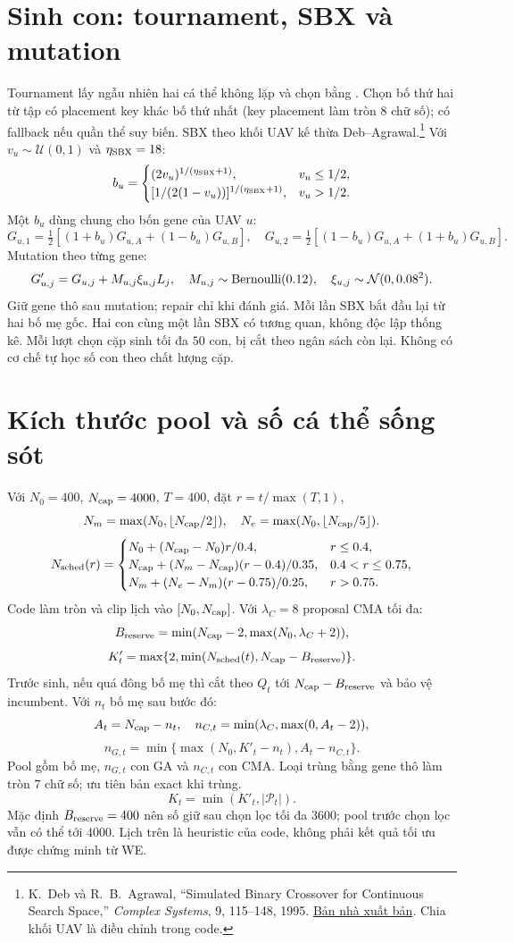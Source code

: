 \documentclass[11pt,a4paper]{article}
\newcommand{\code}[1]{\texttt{\detokenize{#1}}}
\begin{document}
\section{Sinh con: tournament, SBX và mutation}
Tournament lấy ngẫu nhiên hai cá thể không lặp và chọn bằng \code{_better()}.
Chọn bố thứ hai từ tập có placement key khác bố thứ nhất (key placement làm tròn $8$ chữ số); có fallback nếu quần thể suy biến.
SBX theo khối UAV kế thừa Deb--Agrawal.\footnote{K.~Deb và R.~B.~Agrawal, ``Simulated Binary Crossover for Continuous Search Space,'' \emph{Complex Systems}, 9, 115--148, 1995. \href{https://content.wolfram.com/uploads/sites/13/2018/02/09-2-2.pdf}{Bản nhà xuất bản}. Chia khối UAV là điều chỉnh trong code.}
Với $v_u\sim\mathcal U(0,1)$ và $\eta_{\rm SBX}=18$:
\[
b_u=\begin{cases}(2v_u)^{1/(\eta_{\rm SBX}+1)},&v_u\le1/2,\\
[1/(2(1-v_u))]^{1/(\eta_{\rm SBX}+1)},&v_u>1/2.
\end{cases}
\]
Một $b_u$ dùng chung cho bốn gene của UAV $u$:
\[
G_{u,1}=\tfrac12[(1+b_u)G_{u,A}+(1-b_u)G_{u,B}],\quad
G_{u,2}=\tfrac12[(1-b_u)G_{u,A}+(1+b_u)G_{u,B}].
\]
Mutation theo từng gene:
\[
G'_{u,j}=G_{u,j}+M_{u,j}\xi_{u,j}L_j,\quad
M_{u,j}\sim{\rm Bernoulli}(0.12),\quad\xi_{u,j}\sim\mathcal N(0,0.08^2).
\]
Giữ gene thô sau mutation; repair chỉ khi đánh giá. Mỗi lần SBX bắt đầu lại từ hai bố mẹ gốc. Hai con cùng một lần SBX có tương quan, không độc lập thống kê.
Mỗi lượt chọn cặp sinh tối đa $50$ con, bị cắt theo ngân sách còn lại. Không có cơ chế tự học số con theo chất lượng cặp.

\section{Kích thước pool và số cá thể sống sót}
Với $N_0=400$, $N_{\rm cap}=4000$, $T=400$, đặt $r=t/\max(T,1)$,
\[
N_m=\max(N_0,\lfloor N_{\rm cap}/2\rfloor),\quad
N_e=\max(N_0,\lfloor N_{\rm cap}/5\rfloor).
\]
\[
N_{\rm sched}(r)=\begin{cases}
N_0+(N_{\rm cap}-N_0)r/0.4,&r\le0.4,\\
N_{\rm cap}+(N_m-N_{\rm cap})(r-0.4)/0.35,&0.4<r\le0.75,\\
N_m+(N_e-N_m)(r-0.75)/0.25,&r>0.75.
\end{cases}
\]
Code làm tròn và clip lịch vào $[N_0,N_{\rm cap}]$.
Với $\lambda_C=8$ proposal CMA tối đa:
\[
B_{\rm reserve}=\min(N_{\rm cap}-2,\max(N_0,\lambda_C+2)),
\]
\[
K'_t=\max\{2,\min(N_{\rm sched}(t),N_{\rm cap}-B_{\rm reserve})\}.
\]
Trước sinh, nếu quá đông bố mẹ thì cắt theo $Q_t$ tới $N_{\rm cap}-B_{\rm reserve}$ và bảo vệ incumbent.
Với $n_t$ bố mẹ sau bước đó:
\[
A_t=N_{\rm cap}-n_t,\quad n_{C,t}=\min(\lambda_C,\max(0,A_t-2)),
\]
\[
n_{G,t}=\min\{\max(N_0,K'_t-n_t),A_t-n_{C,t}\}.
\]
Pool gồm bố mẹ, $n_{G,t}$ con GA và $n_{C,t}$ con CMA. Loại trùng bằng gene thô làm tròn $7$ chữ số; ưu tiên bản exact khi trùng.
\[
K_t=\min(K'_t,|\mathcal P_t|).
\]
Mặc định $B_{\rm reserve}=400$ nên số giữ sau chọn lọc tối đa $3600$; pool trước chọn lọc vẫn có thể tới $4000$.
Lịch trên là heuristic của code, không phải kết quả tối ưu được chứng minh từ WE.
\end{document}
